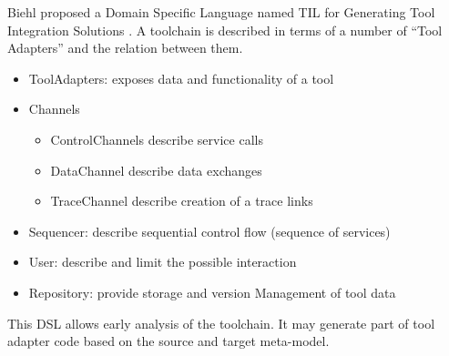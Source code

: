 \documentclass{openetcs_report}
\begin{document}
Biehl proposed a Domain Specific Language named TIL for Generating Tool Integration
Solutions \cite{biehl_matthias_domain_2011}.  A toolchain is described in terms
of a number of ``Tool Adapters'' and the relation between them.
\begin{itemize}
\item ToolAdapters: exposes data and functionality of a tool
\item Channels
  \begin{itemize}
  \item ControlChannels describe service calls
  \item DataChannel describe data exchanges
  \item TraceChannel  describe creation of a trace links
  \end{itemize}

\item Sequencer: describe sequential control flow (sequence of services)
\item User:  describe and limit the possible interaction
\item Repository:  provide storage and version Management of tool data
\end{itemize}
This DSL allows early analysis of the toolchain.
It may generate part of tool adapter code based on the source and target
meta-model.
\end{document}
